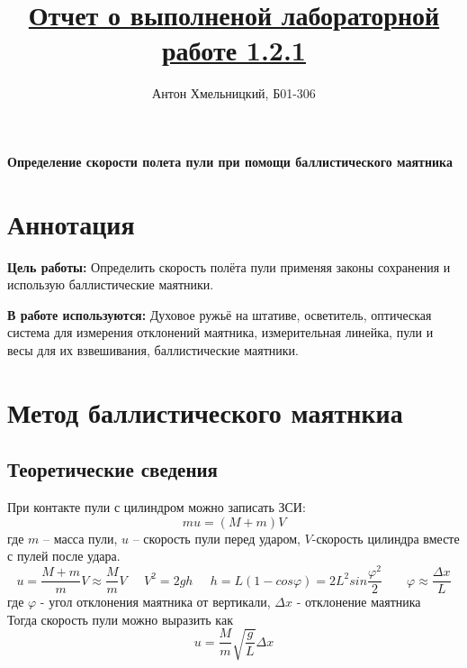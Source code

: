 \documentclass[a4paper]{article}
\title{\underline{Отчет о выполненой лабораторной работе 1.2.1}}
\author{Антон Хмельницкий, Б01-306}
\begin{document}
\maketitle
\begin{center}
\Large{\textbf{Определение скорости полета пули при помощи баллистического маятника}}
\end{center}

\section{Аннотация}
    \par \textbf{Цель работы:} Определить скорость полёта пули применяя законы сохранения и использую баллистические маятники.\\
    \par \noindent \textbf{В работе используются:} Духовое ружьё на штативе, осветитель, оптическая система для измерения отклонений маятника, измерительная линейка, пули и весы для их взвешивания, баллистические маятники.

\section{Метод баллистического маятнкиа}

\subsection{Теоретические сведения}
При контакте пули с цилиндром можно записать ЗСИ:
	\begin{equation}
		 mu = (M+m)V
	\end{equation}
	где $m$ -- масса пули, $u$ -- скорость пули перед ударом, $V$-скорость цилиндра вместе с пулей после удара.
	\begin{equation}
		u=\frac{M+m}{m}V \approx \frac{M}{m}V \;\;\;\;\; V^2=2gh \;\;\;\;\; h = L(1-cos \varphi ) = 2L^2 sin \frac{\varphi^2}{2} \;\;\;\;\;\;\; \varphi \approx \frac{\Delta x}{L} 
	\end{equation}
        где $\varphi$ - угол отклонения маятника от вертикали, $\Delta x$ - отклонение маятника\\
	Тогда скорость пули можно выразить как
	\begin{equation} \label{vel1}
	 u=\frac{M}{m} \sqrt{\frac{g}{L}} \Delta x
	\end{equation}
\newpage
\end{document}
